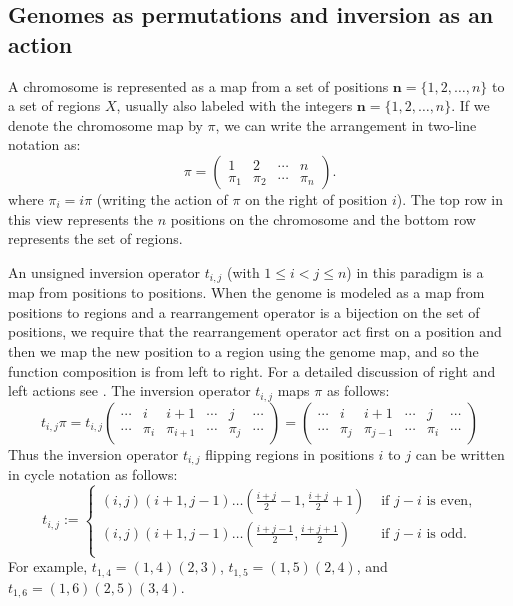 \documentclass[utf8]{Frontiers_LaTex_Templates/frontiersFPHY} %
\newcommand{\tij}[1]{t_{#1}}
\newcommand{\n}{\mathbf n}
\numberwithin{equation}{section}
\begin{document}
\medskip
\subsection*{Genomes as permutations and inversion as an action}

A chromosome is represented as a map from a set of positions $\n=\{ 1,2,\dots,n\}$ to a set of regions $X$, usually also labeled with the integers $\n=\{1,2,\dots,n\}$. If we denote the chromosome map by $\pi$, we can write the arrangement in two-line notation as:
\[
\pi=\begin{pmatrix}
1 & 2 & \cdots & n\\
\pi_1 & \pi_2 & \cdots & \pi_n
\end{pmatrix}.
\]
where $\pi_i = i\pi$ (writing the action of $\pi$ on the right of position $i$). The top row in this view represents the $n$ positions on the chromosome and the bottom row represents the set of regions.  


An unsigned inversion operator $\tij{i,j}$ (with $1\le i<j\le n$) in this paradigm is a map from positions to positions. 
When the genome is modeled as a map from positions to regions and a rearrangement operator is a bijection on the set of positions, we require that the rearrangement operator act first on a position and then we map the new position to a region using the genome map,
and so the function composition is from left to right. For a detailed discussion of right and left actions see \citet{bhatia2018position}. The inversion operator $\tij{i,j}$ maps $\pi$ as follows:
\[
\tij{i,j}\pi=
\tij{i,j} \begin{pmatrix}
\cdots & i     & i+1       & \cdots & j     & \cdots\\
\cdots & \pi_i & \pi_{i+1} & \cdots & \pi_j & \cdots
\end{pmatrix} =  
\begin{pmatrix}
\cdots & i & i+1 & \cdots & j & \cdots\\
\cdots & \pi_j & \pi_{j-1} & \cdots & \pi_i & \cdots
\end{pmatrix}
\]
Thus the inversion operator $\tij{i,j}$ flipping regions in positions $i$ to $j$ can be written in cycle notation as follows:
\[ \tij{i,j} := 
\begin{cases}
(i,j)(i+1, j-1)\dots (\frac{i+j}{2} - 1, \frac{i+j}{2} + 1) & \text{ if } j -i \text{ is even,} \\
(i,j)(i+1, j-1)\dots (\frac{i+j-1}{2}, \frac{i+j+1}{2}) & \text{ if } j -i \text{ is odd.} \\
\end{cases} \]
%
For example, $t_{1,4}=(1,4)(2,3)$, $t_{1,5}=(1, 5)(2, 4)$, and $t_{1,6} = (1, 6)(2, 5)(3, 4)$.
\end{document}
